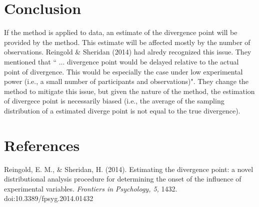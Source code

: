 \documentclass{article}
\begin{document}
  
\section{Conclusion}

If the method is applied to data, an estimate of the divergence point will be provided by the method. This estimate will be affected mostly by the number of observations. Reingold \& Sheridan (2014) had alredy recognized this issue. They mentioned that `` ... divergence point would be delayed relative to the actual point of divergence. This would be especially the case under low experimental power (i.e., a small number of participants and observations)". They change the method to mitigate this issue, but given the nature of the method, the estimation of divergece point is necessarily biased (i.e., the average of  the sampling distribution of a estimated diverge point is not equal to the true divergence).

\newpage

\section{References}

Reingold, E. M., \& Sheridan, H. (2014). Estimating the divergence point: a novel distributional analysis procedure for determining the onset of the influence of experimental variables. \emph{Frontiers in Psychology, 5,} 1432. doi:10.3389/fpsyg.2014.01432
\end{document}
